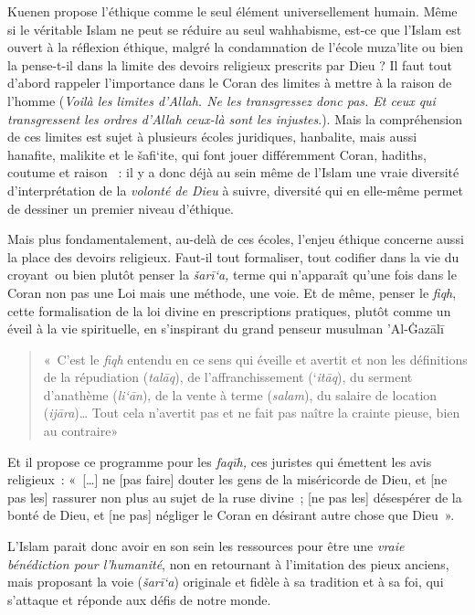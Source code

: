 Kuenen propose l'éthique comme le seul élément universellement humain.
Même si le véritable Islam ne peut se réduire au seul wahhabisme, est-ce
que l'Islam est ouvert à la réflexion éthique, malgré la condamnation de
l'école muza'lite ou bien la pense-t-il dans la limite des devoirs
religieux prescrits par Dieu ? Il faut tout d'abord rappeler
l'importance dans le Coran des limites à mettre à la raison de l'homme
(\emph{Voilà les limites d'Allah. Ne les transgressez donc pas. Et ceux
qui transgressent les ordres d'Allah ceux-là sont les
injustes}.). Mais la compréhension de ces limites est
sujet à plusieurs écoles juridiques, hanbalite, mais aussi hanafite,
malikite et le šafi`ite, qui font jouer différemment Coran, hadiths,
coutume et raison ~: il y a donc déjà au sein même de l'Islam une vraie
diversité d'interprétation de la \emph{volonté de Dieu} à suivre,
diversité qui en elle-même permet de dessiner un premier niveau
d'éthique.

Mais plus fondamentalement, au-delà de ces écoles, l'enjeu éthique
concerne aussi la place des devoirs religieux\emph{.} Faut-il tout
formaliser, tout codifier dans la vie du croyant~ou bien plutôt penser
la \emph{šarī`a,} terme qui n'apparaît qu'une fois dans le Coran non pas
une Loi mais une méthode, une voie. Et de même,
penser le \emph{fiqh}, cette formalisation de la loi divine en
prescriptions pratiques, plutôt comme un éveil à la vie spirituelle, en
s'inspirant du grand penseur musulman 'Al-Ġazālī  

\begin{quote}
    

«~C'est le \emph{fiqh} entendu en ce sens qui éveille et avertit et non
les définitions de la répudiation (\emph{talāq}), de l'affranchissement
(`\emph{itāq}), du serment d'anathème (\emph{li`ān}), de la vente à
terme (\emph{salam}), du salaire de location (\emph{ijāra})\ldots{} Tout
cela n'avertit pas et ne fait pas naître la crainte pieuse, bien au
contraire»
\end{quote}
Et il propose ce programme pour les \emph{faqīh,} ces juristes qui
émettent les avis religieux~: «~{[}\ldots{]} ne {[}pas faire{]} douter
les gens de la miséricorde de Dieu, et {[}ne pas les{]} rassurer non
plus au sujet de la ruse divine~; {[}ne pas les{]} désespérer de la
bonté de Dieu, et {[}ne pas{]} négliger le Coran en désirant autre chose
que Dieu~».

L'Islam parait donc avoir en son sein les ressources pour être une
\emph{vraie bénédiction pour l'humanité}, non en retournant à
l'imitation des pieux anciens, mais proposant la voie (\emph{šarī`a})
originale et fidèle à sa tradition et à sa foi, qui s'attaque et réponde
aux défis de notre monde.
